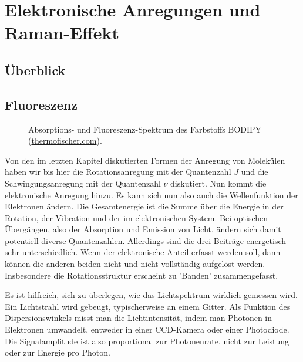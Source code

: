 \renewcommand{\lastmod}{16. Dezember 2024}
\renewcommand{\chapterauthors}{Markus Lippitz}

\chapter{Elektronische Anregungen  und Raman-Effekt}









\section{Überblick}

\section{Fluoreszenz}

\begin{figure}
  \caption{Absorptions- und Fluoreszenz-Spektrum des Farbstoffs BODIPY  (\href{https://www.thermofisher.com/de/de/home/life-science/cell-analysis/labeling-chemistry/fluorescence-spectraviewer.html?SID=srch-svtool&UID=10001moh}{thermofischer.com}).}
\end{figure}





Von den im letzten Kapitel diskutierten Formen der Anregung von Molekülen haben wir bis hier die Rotationsanregung mit der Quantenzahl $J$ und die Schwingungsanregung mit der Quantenzahl $\nu$ diskutiert. Nun kommt die  elektronische Anregung hinzu. Es kann sich nun also auch die Wellenfunktion der Elektronen ändern. Die Gesamtenergie ist die Summe über die Energie in der Rotation, der Vibration und der im elektronischen System. Bei optischen Übergängen, also der Absorption und Emission von Licht, ändern sich damit potentiell diverse Quantenzahlen. Allerdings sind die drei Beiträge energetisch sehr unterschiedlich. Wenn der elektronische Anteil erfasst werden soll, dann können die anderen beiden nicht und nicht vollständig aufgelöst werden. Insbesondere die Rotationsstruktur erscheint zu 'Banden' zusammengefasst.



Es ist hilfreich, sich zu überlegen, wie das Lichtspektrum wirklich gemessen wird. Ein Lichtstrahl wird gebeugt, typischerweise an einem Gitter. Als Funktion des Dispersionswinkels misst man die Lichtintensität, indem man Photonen in Elektronen umwandelt, entweder in einer CCD-Kamera oder einer Photodiode. Die Signalamplitude ist also proportional zur Photonenrate, nicht zur Leistung oder zur Energie pro Photon.

